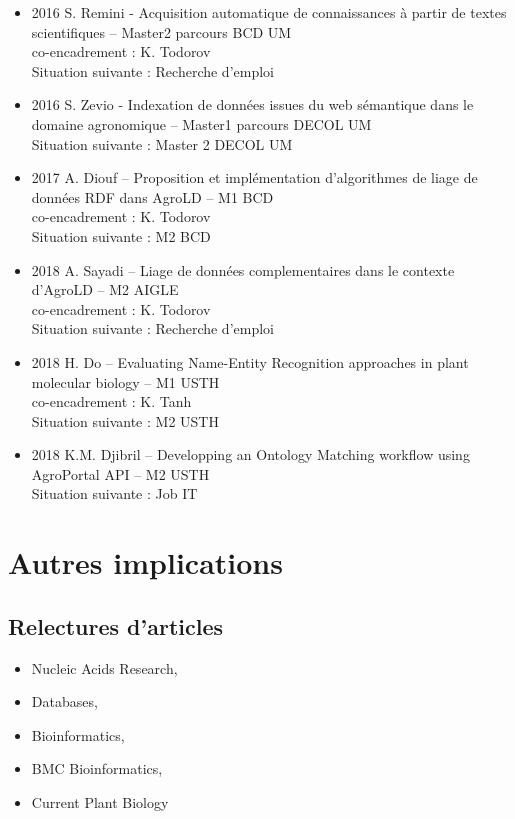 \begin{itemize}
\item 2016 S. Remini - Acquisition automatique de connaissances à partir de textes scientifiques – Master2 parcours BCD UM \\
co-encadrement : K. Todorov \\ 
Situation suivante : Recherche d’emploi

\item  2016 S. Zevio - Indexation de données issues du web sémantique dans le domaine agronomique – Master1 parcours DECOL UM \\
Situation suivante : Master 2 DECOL UM 

\item  2017 A. Diouf –  Proposition et implémentation d’algorithmes de liage de données RDF dans AgroLD – M1 BCD \\
co-encadrement : K. Todorov \\
Situation suivante : M2 BCD

\item  2018 A. Sayadi –  Liage de données complementaires dans le contexte d'AgroLD – M2 AIGLE \\
co-encadrement : K. Todorov \\
Situation suivante : Recherche d'emploi

\item  2018 H. Do –  Evaluating Name-Entity Recognition approaches in plant molecular biology – M1 USTH \\
co-encadrement : K. Tanh \\
Situation suivante : M2 USTH

\item  2018 K.M. Djibril –  Developping an Ontology Matching workflow using AgroPortal API – M2 USTH \\
Situation suivante : Job IT
\end{itemize}

\section{Autres implications}
\subsection*{Relectures d’articles}
\begin{itemize}
\item Nucleic Acids Research, 
\item Databases, 
\item Bioinformatics,
\item BMC Bioinformatics, 
\item Current Plant Biology
\end{itemize}

